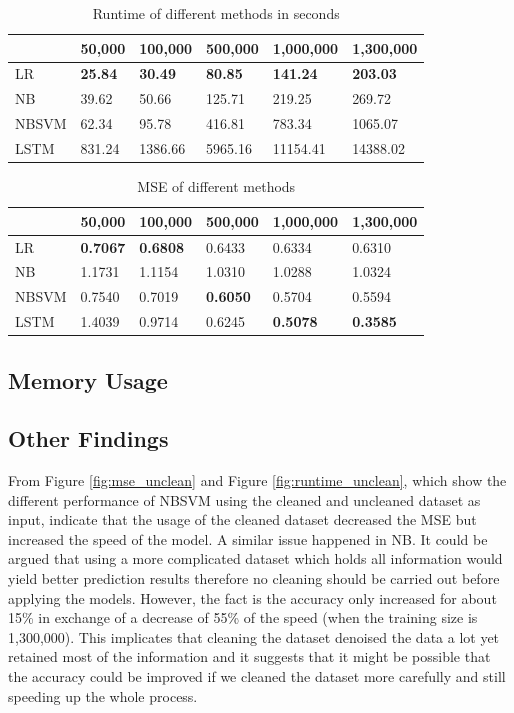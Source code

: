 \documentclass[letterpaper]{article} %
\begin{document}
\begin{table}
\centering
\caption{Runtime of different methods in seconds}
\label{tab:runtime}
\begin{tabular}{l | lllll}
      & 50,000 & 100,000 & 500,000 & 1,000,000 & 1,300,000 \\ \hline
LR    & {\bf 25.84}  & {\bf 30.49}   & {\bf 80.85}   & {\bf 141.24}    & {\bf 203.03}    \\
NB    & 39.62  & 50.66   & 125.71  & 219.25    & 269.72    \\
NBSVM & 62.34  & 95.78   & 416.81  & 783.34    & 1065.07   \\
LSTM  & 831.24 & 1386.66 & 5965.16 & 11154.41  & 14388.02 
\end{tabular}
\end{table}

\begin{table}
\centering
\caption{MSE of different methods}
\label{tab:mse}
\begin{tabular}{l | lllll}
      & 50,000 & 100,000 & 500,000 & 1,000,000 & 1,300,000 \\ \hline
LR    & {\bf 0.7067} & {\bf 0.6808}  & 0.6433  & 0.6334    & 0.6310    \\
NB    & 1.1731 & 1.1154  & 1.0310  & 1.0288    & 1.0324    \\
NBSVM & 0.7540 & 0.7019  & {\bf 0.6050}  & 0.5704    & 0.5594    \\
LSTM  & 1.4039 & 0.9714  & 0.6245  & {\bf 0.5078}    & {\bf 0.3585}   
\end{tabular}
\end{table}

\subsection{Memory Usage}


\subsection{Other Findings}
From Figure \ref{fig:mse_unclean} and Figure \ref{fig:runtime_unclean}, which show the different performance of NBSVM using the cleaned and uncleaned dataset as input, indicate that the usage of the cleaned dataset decreased the MSE but increased the speed of the model. A similar issue happened in NB. It could be argued that using a more complicated dataset which holds all information would yield better prediction results therefore no cleaning should be carried out before applying the models. However, the fact is the accuracy only increased for about 15\% in exchange of a decrease of 55\% of the speed (when the training size is 1,300,000). This implicates that cleaning the dataset denoised the data a lot yet retained most of the information and it suggests that it might be possible that the accuracy could be improved if we cleaned the dataset more carefully and still speeding up the whole process. 
\end{document}
